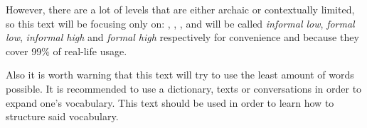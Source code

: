 However, there are a lot of levels that are either archaic or contextually limited, so this text will be focusing only on: , , ,  and will be called \textit{informal low}, \textit{formal low}, \textit{informal high} and \textit{formal high} respectively for convenience and because they cover 99\% of real-life usage.

Also it is worth warning that this text will try to use the least amount of words possible. It is recommended to use a dictionary, texts or conversations in order to expand one's vocabulary. This text should be used in order to learn how to structure said vocabulary.